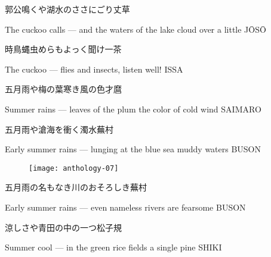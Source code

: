 \begin{haiku}
    {\FH 郭公鳴くや湖水のささにごり}\hfill{\FH 丈草}

    \vin{} The cuckoo calls ---
    \vin{} \vin{} and the waters of the lake
    \vin{} \vin{} \vin{} cloud over a little \hspace{\fill} J\={O}S\={O}
\end{haiku}

\begin{haiku}
    {\FH 時鳥蝿虫めらもよっく聞け}\hfill{\FH 一茶}

    \vin{} The cuckoo ---
    \vin{} \vin{} flies and insects,
    \vin{} \vin{} \vin{} listen well! \hspace{\fill} ISSA
\end{haiku}

\begin{haiku}
    {\FH 五月雨や梅の葉寒き風の色}\hfill{\FH 才麿}

    \vin{} Summer rains ---
    \vin{} \vin{} leaves of the plum
    \vin{} \vin{} \vin{} the color of cold wind \hspace{\fill} SAIMARO
\end{haiku}

\begin{haiku}
    {\FH 五月雨や滄海を衝く濁水}\hfill{\FH 蕪村}

    \vin{} Early summer rains ---
    \vin{} \vin{} lunging at the blue sea
    \vin{} \vin{} \vin{} muddy waters \hspace{\fill} BUSON
\end{haiku}

\begin{figure}
    \texttt{[image: anthology-07]}
\end{figure}

\begin{haiku}
    {\FH 五月雨の名もなき川のおそろしき}\hfill{\FH 蕪村}

    \vin{} Early summer rains ---
    \vin{} \vin{} even nameless rivers
    \vin{} \vin{} \vin{} are fearsome \hspace{\fill} BUSON
\end{haiku}

\begin{haiku}
    {\FH 涼しさや青田の中の一つ松}\hfill{\FH 子規}

    \vin{} Summer cool ---
    \vin{} \vin{} in the green rice fields
    \vin{} \vin{} \vin{} a single pine \hspace{\fill} SHIKI
\end{haiku}

